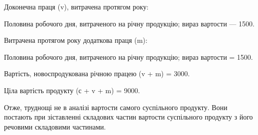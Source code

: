 Доконечна праця (v), витрачена протягом року:

Половина робочого дня, витраченого на річну продукцію; вираз вартости
— 1500.

Витрачена протягом року додаткова праця (m):

Половина робочого дня, витраченого на річну продукцію; вираз вартости
= 1500.

Вартість, новоспродукована річною працею (v + m) = 3000.

Ціла вартість продукту (с + v + m) = 9000.

Отже, труднощі не в аналізі вартости самого суспільного продукту.
Вони постають при зіставленні складових частин вартости суспільного
продукту з його речовими складовими частинами.
